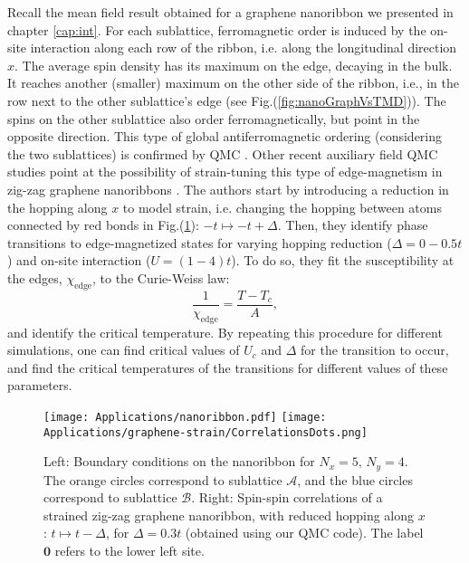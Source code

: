 Recall the mean field result obtained for a graphene nanoribbon we presented in chapter \ref{cap:int}.
For each sublattice, ferromagnetic order is induced by the on-site interaction along each row of the ribbon, i.e. along the longitudinal direction $x$.
The average spin density has its maximum on the edge, decaying in the bulk.
It reaches another (smaller) maximum on the other side of the ribbon, i.e., in the row next to the other sublattice's edge (see Fig.(\ref{fig:nanoGraphVsTMD})).
The spins on the other sublattice also order ferromagnetically, but point in the opposite direction.
This type of global antiferromagnetic ordering (considering the two sublattices) is confirmed by \ac{QMC} \cite{feldner_dynamical_2011, raczkowski_interplay_2017}.
Other recent auxiliary field \ac{QMC} studies point at the possibility of strain-tuning this type of edge-magnetism in zig-zag graphene nanoribbons \cite{yang_strain-tuning_2017}.
The authors start by introducing a reduction in the hopping along $x$ to model strain, i.e. changing the hopping between atoms connected by red bonds in Fig.(\ref{fig:bcRibbon}): $-t \mapsto -t + \Delta$.
Then, they identify phase transitions to edge-magnetized states for varying hopping reduction ($\Delta = 0-0.5t$) and on-site interaction ($U = (1 - 4) t$).
To do so, they fit the susceptibility at the edges, $\chi_{\text{edge}}$, to the Curie-Weiss law:
\begin{equation}
\frac{1}{\chi_{\text{edge}}} = \frac{T - T_c}{A} ,
\end{equation}
and identify the critical temperature.
By repeating this procedure for different simulations, one can find critical values of $U_c$ and $\Delta$ for the transition to occur, and find the critical temperatures of the transitions for different values of these parameters.

\begin{figure}[H]
\hspace{-0.8cm}
\texttt{[image: Applications/nanoribbon.pdf]}
\texttt{[image: Applications/graphene-strain/CorrelationsDots.png]}
	\caption[Boundary conditions on the nanoribbon. Spin-spin correlations of a strained zig-zag graphene nanoribbon.]{Left: Boundary conditions on the nanoribbon for $N_x = 5, \, N_y = 4$. The orange circles correspond to sublattice $\mathcal{A}$, and the blue circles correspond to sublattice $\mathcal{B}$.
	Right: Spin-spin correlations of a strained zig-zag graphene nanoribbon, with reduced hopping along $x$: $t \mapsto t - \Delta$, for $\Delta = 0.3t$ (obtained using our \ac{QMC} code).
	The label $\bm 0$ refers to the lower left site.
}
	\label{fig:bcRibbon}
\end{figure}

